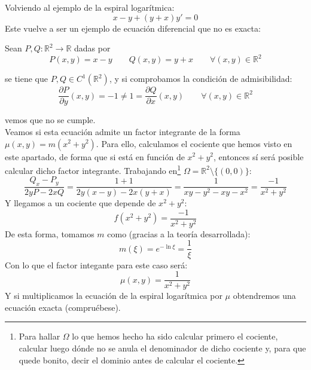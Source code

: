 \begin{ejemplo}
    Volviendo al ejemplo de la espiral logarítmica:
    \begin{equation*}
        x-y+(y+x)y' = 0
    \end{equation*}
    Este vuelve a ser un ejemplo de ecuación diferencial que no es exacta:

    Sean $P,Q:\mathbb{R}^2\rightarrow\mathbb{R}$ dadas por
    \begin{equation*}
        P(x,y) = x-y \qquad Q(x,y) = y+x \qquad \forall (x,y)\in \mathbb{R}^2
    \end{equation*}

    se tiene que $P,Q\in C^1(\mathbb{R}^2)$, y si comprobamos la condición de admisibilidad:
    \begin{equation*}
        \dfrac{\partial P}{\partial y}(x,y) = -1 \neq 1 = \dfrac{\partial Q}{\partial x}(x,y) \qquad \forall (x,y)\in \mathbb{R}^2
    \end{equation*}

    vemos que no se cumple.\\

    Veamos si esta ecuación admite un factor integrante de la forma ${\mu(x,y)=m(x^2+y^2)}$. Para ello, calculamos el cociente que hemos visto en este apartado, de forma que si está en función de $x^2+y^2$, entonces sí será posible calcular dicho factor integrante. Trabajando en\footnote{Para hallar $\Omega$ lo que hemos hecho ha sido calcular primero el cociente, calcular luego dónde no se anula el denominador de dicho cociente y, para que quede bonito, decir el dominio antes de calcular el cociente.} $\Omega=\mathbb{R}^2\setminus\{(0,0)\}$:
    \begin{equation*}
        \dfrac{Q_x-P_y}{2yP-2xQ} = \dfrac{1+1}{2y(x-y)-2x(y+x)} = \dfrac{1}{xy-y^2-xy-x^2} = \dfrac{-1}{x^2+y^2}
    \end{equation*}
    Y llegamos a un cociente que depende de $x^2+y^2$:
    \begin{equation*}
        f(x^2+y^2) = \dfrac{-1}{x^2+y^2}
    \end{equation*}
    De esta forma, tomamos $m$ como (gracias a la teoría desarrollada):
    \begin{equation*}
        m(\xi) = e^{-\ln \xi} = \dfrac{1}{\xi}
    \end{equation*}
    Con lo que el factor integante para este caso será:
    \begin{equation*}
        \mu(x,y) = \dfrac{1}{x^2+y^2}
    \end{equation*}
    Y si multiplicamos la ecuación de la espiral logarítmica por $\mu$ obtendremos una ecuación exacta (compruébese).
\end{ejemplo}

